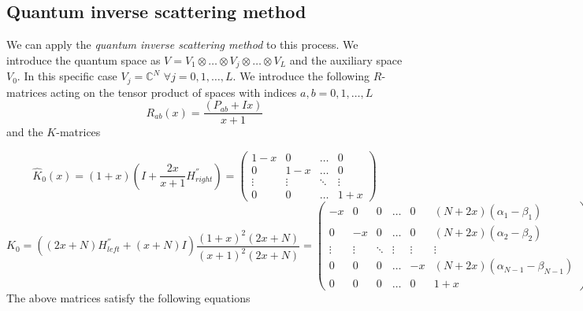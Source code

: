 \documentclass[10pt]{article}
\numberwithin{equation}{section}
\numberwithin{equation}{subsection}
\begin{document}
\subsection{Quantum inverse scattering method}
We can apply the \textit{quantum inverse scattering method} to this process. We introduce the quantum space as $V=V_{1}\otimes\ldots\otimes V_{j}\otimes\ldots\otimes V_{L}$ and the auxiliary space $V_{0}$. In this specific case $V_{j}=\mathbb{C}^{N}$ $\forall j=0,1,\ldots ,L$. We introduce the following $R$-matrices acting on the tensor product of spaces with indices $a,b=0,1,\ldots,L$
\begin{equation}\label{Rmatrix}
	R_{ab}(x)=\frac{(P_{ab}+Ix)}{x+1}
\end{equation}
and the $K$-matrices

\begin{equation}\label{KmatrixHAT}
	\widehat{K}_{0}(x)=(1+x)\left(I+\frac{2x}{x+1}H^{''}_{right}\right)=\begin{pmatrix}
		1-x&0&\ldots&0\\
		0&1-x&\ldots&0\\
		\vdots&\vdots&\ddots&\vdots\\
		0&0&\ldots&1+x
	\end{pmatrix}
\end{equation}
\begin{equation}\label{Kmatrix}
	K_{0}=\left((2x+N)H^{''}_{left}+(x+N)I\right)\frac{(1+x)^{2}(2x+N)}{(x+1)^{2}(2x+N)}=\begin{pmatrix}
		-x&0&0&\ldots&0&(N+2x)(\alpha_{1}-\beta_{1})\\
		0&-x&0&\ldots&0&(N+2x)(\alpha_{2}-\beta_{2})\\
		\vdots&\vdots&\ddots&\vdots&\vdots&\vdots\\
		0&0&0&\ldots&-x&(N+2x)(\alpha_{N-1}-\beta_{N-1})\\
		0&0&0&\ldots&0&1+x
	\end{pmatrix}
\end{equation}
The above matrices satisfy the following equations
\end{document}
